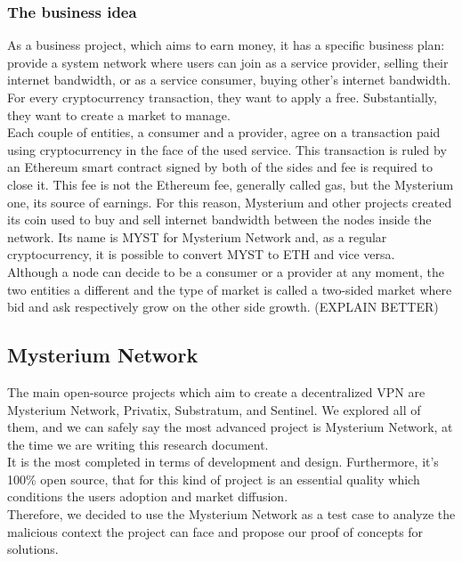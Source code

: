 \documentclass[]{article}
\begin{document}
	\subsubsection{The business idea}
	As a business project, which aims to earn money, it has a specific business plan: provide a system network where users can join as a service provider, selling their internet bandwidth, or as a service consumer, buying other's internet bandwidth. For every cryptocurrency transaction, they want to apply a free. Substantially, they want to create a market to manage.\\
	Each couple of entities, a consumer and a provider, agree on a transaction paid using cryptocurrency in the face of the used service. This transaction is ruled by an Ethereum smart contract signed by both of the sides and fee is required to close it. This fee is not the Ethereum fee, generally called gas, but the Mysterium one, its source of earnings. For this reason, Mysterium and other projects created its coin used to buy and sell internet bandwidth between the nodes inside the network. Its name is MYST for Mysterium Network and, as a regular cryptocurrency, it is possible to convert MYST to ETH and vice versa.\\
	Although a node can decide to be a consumer or a provider at any moment, the two entities a different and the type of market is called a two-sided market where bid and ask respectively grow on the other side growth. (EXPLAIN BETTER)\\

	\subsection{Mysterium Network}
	
	The main open-source projects which aim to create a decentralized VPN are Mysterium Network, Privatix, Substratum, and Sentinel. We explored all of them, and we can safely say the most advanced project is Mysterium Network, at the time we are writing this research document.\\It is the most completed in terms of development and design. Furthermore, it's 100\% open source, that for this kind of project is an essential quality which conditions the users adoption and market diffusion.\\
	Therefore, we decided to use the Mysterium Network as a test case to analyze the malicious context the project can face and propose our proof of concepts for solutions.
	
\end{document}
